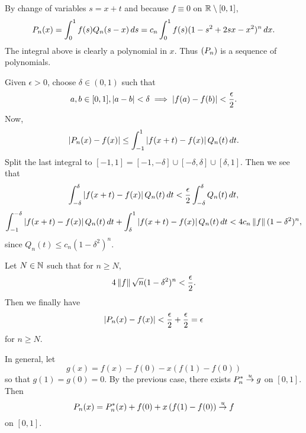 By change of variables \(s = x + t\) and because \(f \equiv 0\) on \(\mathbb{R} \setminus [0, 1]\),
\[
    P_n(x) = \int_0^1 f(s) Q_n(s - x) \,d{s} = c_n \int_0^1 f(s)(1-s^2+2sx-x^2)^n \,d{x}.
\]
The integral above is clearly a polynomial in \(x\). Thus \(\left( P_n \right)\) is a sequence of polynomials.

Given \(\epsilon > 0\), choose \(\delta \in (0, 1)\) such that
\[
    a, b \in [0, 1], \left| a - b \right| < \delta \implies \left| f(a) - f(b) \right| < \frac{\epsilon}{2}.
\]
Now,
\[
    \left| P_n(x) - f(x) \right| \leq \int_{-1}^1 \left| f(x+t) - f(x) \right| Q_n(t)\,d{t}.
\]
Split the last integral to \([-1, 1] = [-1, -\delta] \cup [-\delta, \delta] \cup [\delta, 1]\). Then we see that
\[
    \int_{-\delta}^\delta \left| f(x+t) - f(x) \right| Q_n(t)\,d{t} < \frac{\epsilon}{2} \int_{-\delta}^\delta Q_n(t)\,d{t},
\]
\[
    \int_{-1}^{-\delta} \left| f(x+t) - f(x) \right| Q_n(t)\,d{t} + \int_{\delta}^1 \left| f(x+t) - f(x) \right| Q_n(t)\,d{t} < 4 c_n \left\lVert f \right\rVert (1-\delta^2)^n,
\]
since \(Q_n(t) \leq c_n(1-\delta^2)^n\).

Let \(N \in \mathbb{N}\) such that for \(n \geq N\),
\[
    4 \left\lVert f \right\rVert \sqrt{n} (1-\delta^2)^n < \frac{\epsilon}{2}.
\]
Then we finally have
\[
    \left| P_n(x) - f(x) \right| < \frac{\epsilon}{2} + \frac{\epsilon}{2} = \epsilon
\]
for \(n \geq N\).

In general, let
\[
    g(x) = f(x) - f(0) - x\left(f(1) - f(0)\right)
\]
so that \(g(1) = g(0) = 0\). By the previous case, there exists \(P_n^\ast \overset{u}{\rightarrow} g\) on \([0, 1]\). Then
\[
    P_n(x) = P_n^\ast(x) + f(0) + x\left(f(1) - f(0)\right) \overset{u}{\rightarrow} f
\]
on \([0, 1]\).

\pagebreak
